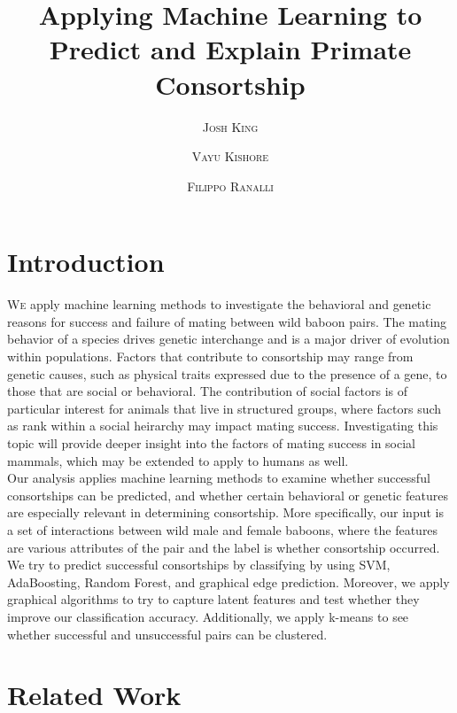 \documentclass[twoside,twocolumn,paper=letter,fontsize=11pt]{article}
\title{Applying Machine Learning to Predict and Explain Primate Consortship} %
\author{%
\textsc{Josh King} \\[1ex] 
\and 
\textsc{Vayu Kishore} \\[1ex] 
\and 
\textsc{Filippo Ranalli} \\[1ex] 
}
\date{} %
\begin{document}
\maketitle

\section{Introduction}


\lettrine[nindent=0em,lines=3]{W}e apply machine learning methods to
investigate the behavioral and genetic reasons for success and failure of mating
between wild baboon pairs. The mating behavior of a species drives genetic
interchange and is a major driver of evolution within populations. Factors that
contribute to consortship may range from genetic causes, such as physical traits
expressed due to the presence of a gene, to those that are social or behavioral.
The contribution of social factors is of particular interest for animals that
live in structured groups, where factors such as rank within a social heirarchy
may impact mating success.  Investigating this topic will provide deeper insight
into the factors of mating success in social mammals, which may be extended to
apply to humans as well.\\

Our analysis applies machine learning methods to examine whether successful
consortships can be predicted, and whether certain behavioral or genetic
features are especially relevant in determining consortship. More specifically,
our input is a set of interactions between wild male and female baboons, where
the features are various attributes of the pair and the label is whether
consortship occurred. We try to predict successful consortships by classifying
by using SVM, AdaBoosting, Random Forest, and graphical edge prediction.
Moreover, we apply graphical algorithms to try to capture latent features and
test whether they improve our classification accuracy.  Additionally, we apply
k-means to see whether successful and unsuccessful pairs can be clustered.


\section{Related Work}
\end{document}
